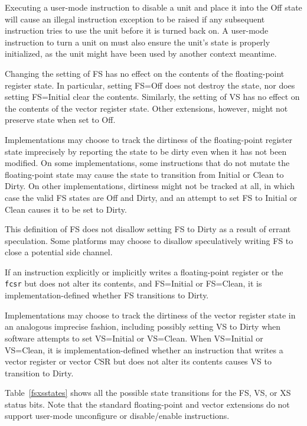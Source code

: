 Executing a user-mode instruction to disable a unit and place it into
the Off state will cause an illegal instruction exception to be raised
if any subsequent instruction tries to use the unit before it is
turned back on.  A user-mode instruction to turn a unit on must also
ensure the unit's state is properly initialized, as the unit might
have been used by another context meantime.

Changing the setting of FS has no effect on the contents of the floating-point
register state.  In particular, setting FS=Off does not destroy the state, nor
does setting FS=Initial clear the contents.
Similarly, the setting of VS has no effect on the contents of the vector register
state.
Other extensions, however, might not preserve state when set to Off.

Implementations may choose to track the dirtiness of the floating-point
register state imprecisely by reporting the state to be dirty even when
it has not been modified.  On some implementations, some instructions that
do not mutate the floating-point state may cause the state to transition from
Initial or Clean to Dirty.  On other implementations, dirtiness might not be
tracked at all, in which case the valid FS states are Off and Dirty, and an
attempt to set FS to Initial or Clean causes it to be set to Dirty.
\begin{commentary}
This definition of FS does not disallow setting FS to Dirty as a result of
errant speculation.  Some platforms may choose to disallow speculatively
writing FS to close a potential side channel.
\end{commentary}

If an instruction explicitly or implicitly writes a floating-point register or
the {\tt fcsr} but does not alter its contents, and FS=Initial or FS=Clean, it
is implementation-defined whether FS transitions to Dirty.

Implementations may choose to track the dirtiness of the vector register state in an
analogous imprecise fashion, including possibly setting VS to Dirty when
software attempts to set VS=Initial or VS=Clean.
When VS=Initial or VS=Clean, it is implementation-defined whether an
instruction that writes a vector register or vector CSR but does not alter its
contents causes VS to transition to Dirty.

Table~\ref{fsxsstates} shows all the possible state transitions for
the FS, VS, or XS status bits.  Note that the standard floating-point
and vector extensions do not support user-mode unconfigure or disable/enable
instructions.

